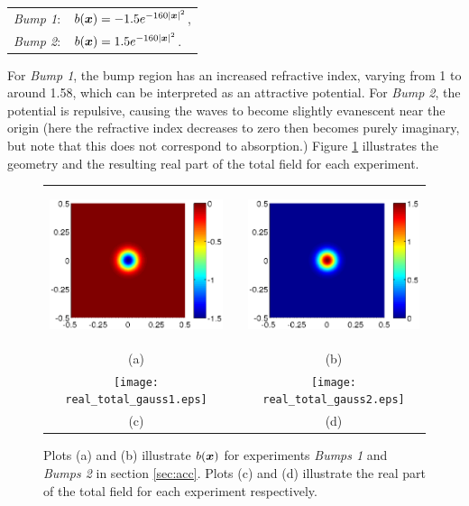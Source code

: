 \documentclass[11pt,final]{amsart}
\theoremstyle{definition}
\numberwithin{remark}{section}
\numberwithin{definition}{section}
\numberwithin{pro}{section}
\begin{document}
\vspace{.5ex}
\begin{tabular}{rl}
\emph{Bump 1}: &  $b(\bm{x}) = -1.5e^{-160 |\bm{x}|^2}$,\\
\emph{Bump 2}: &  $b(\bm{x}) = 1.5e^{-160 |\bm{x}|^2}$.\\
\end{tabular}
\vspace{.5ex}

For \emph{Bump 1}, the bump region has an increased refractive index,
varying from 1 to around 1.58, which can be interpreted as an attractive potential.
For \emph{Bump 2}, the potential is repulsive, causing the waves to become slightly evanescent
near the origin (here the refractive index decreases to zero then becomes purely imaginary,
but note that this does not correspond to absorption.)
Figure \ref{fig:bumps} illustrates
the geometry and the resulting real part of the total field for each experiment.

\begin{figure}[ht]
 \begin{tabular}{ccc}
\includegraphics[height=45mm]{gauss1_bump.eps}&\mbox{}& \includegraphics[height=45mm]{gauss2_bump.eps}\\
(a)& \mbox{}& (b)\\
 \texttt{[image: real\_total\_gauss1.eps]}&\mbox{}& \texttt{[image: real\_total\_gauss2.eps]}\\
(c)& \mbox{}& (d)\\
\end{tabular}
\caption{\label{fig:bumps} Plots (a) and (b) illustrate $b(\bm{x})$ for experiments \emph{Bumps 1} and \emph{Bumps 2} in section \ref{sec:acc}.  Plots (c) and (d)
illustrate the real part of the total field for each experiment respectively. }
\end{figure}
\end{document}

